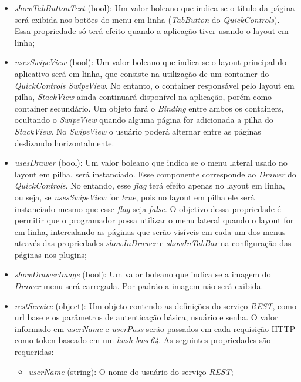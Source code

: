 \begin{itemize}
	\item \textit{showTabButtonText} (bool): Um valor boleano que indica se o título da página será exibida nos botões do menu em linha (\textit{TabButton} do \textit{QuickControls}). Essa propriedade só terá efeito quando a aplicação tiver usando o layout em linha;

	\item \textit{usesSwipeView} (bool): Um valor boleano que indica se o layout principal do aplicativo será em linha, que consiste na utilização de um container do \textit{QuickControls} \textit{SwipeView}. No entanto, o container responsável pelo layout em pilha, \textit{StackView} ainda continuará disponível na aplicação, porém como container secundário. Um objeto fará o \textit{Binding} entre ambos os containers, ocultando o \textit{SwipeView} quando alguma página for adicionada a pilha do \textit{StackView}. No \textit{SwipeView} o usuário poderá alternar entre as páginas deslizando horizontalmente.

	\item \textit{usesDrawer} (bool): Um valor boleano que indica se o menu lateral usado no layout em pilha, será instanciado. Esse componente corresponde ao \textit{Drawer} do \textit{QuickControls}. No entando, esse \textit{flag} terá efeito apenas no layout em linha, ou seja, se \textit{usesSwipeView} for \textit{true}, pois no layout em pilha ele será instanciado mesmo que esse \textit{flag} seja \textit{false}. O objetivo dessa propriedade é permitir que o programador possa utilizar o menu lateral quando o layout for em linha, intercalando as páginas que serão visíveis em cada um dos menus através das propriedades \textit{showInDrawer} e \textit{showInTabBar} na configuração das páginas nos plugins;

	\item \textit{showDrawerImage} (bool): Um valor boleano que indica se a imagem do \textit{Drawer} menu será carregada. Por padrão a imagem não será exibida.

	\item \textit{restService} (object): Um objeto contendo as definições do serviço \textit{REST}, como url base e os parâmetros de autenticação básica, usuário e senha. O valor informado em \textit{userName} e \textit{userPass} serão passados em cada requisição HTTP como token baseado em um \textit{hash} \textit{base64}. As seguintes propriedades são requeridas:

	\begin{itemize}
		\item \textit{userName} (string): O nome do usuário do serviço \textit{REST};


\end{itemize}
\end{itemize}
